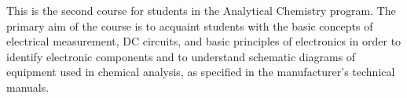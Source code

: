 {This is the second course for students in the Analytical Chemistry program. The primary aim of the course is to acquaint students with the basic concepts of electrical measurement, DC circuits, and basic principles of electronics in order to identify electronic components and to understand schematic diagrams of equipment used in chemical analysis, as specified in the manufacturer's technical manuals.}
